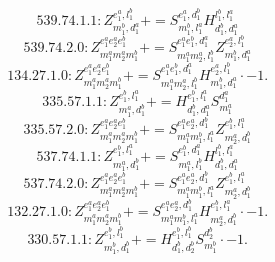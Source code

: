 \documentclass[letterpaper,10pt,fleqn,leqno,onecolumn]{article}
\begin{document}
\begin{equation} \;\;\;\;\;\;  539.74.1.1: Z^{e_{1}^{a},l_{1}^{b}}_{m_{1}^{b},d_{1}^{a}}+=S^{e_{1}^{a},d_{1}^{b}}_{m_{1}^{b},l_{1}^{a}}H^{l_{1}^{b},l_{1}^{a}}_{d_{1}^{b},d_{1}^{a}} \end{equation}
\begin{equation} \;\;\;\;\;\;  539.74.2.0: Z^{e_{1}^{a}e_{2}^{a}e_{1}^{b}}_{m_{1}^{a}m_{2}^{a}m_{1}^{b}}+=S^{e_{1}^{a}e_{1}^{b},d_{1}^{a}}_{m_{1}^{a}m_{2}^{a},l_{1}^{b}}Z^{e_{2}^{a},l_{1}^{b}}_{m_{1}^{b},d_{1}^{a}} \end{equation}
\begin{equation} \;\;\;\;\;\;  134.27.1.0: Z^{e_{1}^{a}e_{2}^{a}e_{1}^{b}}_{m_{1}^{a}m_{2}^{a}m_{1}^{b}}+=S^{e_{1}^{a}e_{1}^{b},d_{1}^{a}}_{m_{1}^{a}m_{2}^{a},l_{1}^{b}}H^{e_{2}^{a},l_{1}^{b}}_{m_{1}^{b},d_{1}^{a}}\cdot -1. \end{equation}
\begin{equation} \;\;\;\;\;\;  335.57.1.1: Z^{e_{1}^{b},l_{1}^{a}}_{m_{1}^{a},d_{1}^{b}}+=H^{e_{1}^{b},l_{1}^{a}}_{d_{1}^{b},d_{1}^{a}}S^{d_{1}^{a}}_{m_{1}^{a}} \end{equation}
\begin{equation} \;\;\;\;\;\;  335.57.2.0: Z^{e_{1}^{a}e_{2}^{a}e_{1}^{b}}_{m_{1}^{a}m_{2}^{a}m_{1}^{b}}+=S^{e_{1}^{a}e_{2}^{a},d_{1}^{b}}_{m_{1}^{a}m_{1}^{b},l_{1}^{a}}Z^{e_{1}^{b},l_{1}^{a}}_{m_{2}^{a},d_{1}^{b}} \end{equation}
\begin{equation} \;\;\;\;\;\;  537.74.1.1: Z^{e_{1}^{b},l_{1}^{a}}_{m_{1}^{a},d_{1}^{b}}+=S^{e_{1}^{b},d_{1}^{a}}_{m_{1}^{a},l_{1}^{b}}H^{l_{1}^{b},l_{1}^{a}}_{d_{1}^{b},d_{1}^{a}} \end{equation}
\begin{equation} \;\;\;\;\;\;  537.74.2.0: Z^{e_{1}^{a}e_{2}^{a}e_{1}^{b}}_{m_{1}^{a}m_{2}^{a}m_{1}^{b}}+=S^{e_{1}^{a}e_{2}^{a},d_{1}^{b}}_{m_{1}^{a}m_{1}^{b},l_{1}^{a}}Z^{e_{1}^{b},l_{1}^{a}}_{m_{2}^{a},d_{1}^{b}} \end{equation}
\begin{equation} \;\;\;\;\;\;  132.27.1.0: Z^{e_{1}^{a}e_{2}^{a}e_{1}^{b}}_{m_{1}^{a}m_{2}^{a}m_{1}^{b}}+=S^{e_{1}^{a}e_{2}^{a},d_{1}^{b}}_{m_{1}^{a}m_{1}^{b},l_{1}^{a}}H^{e_{1}^{b},l_{1}^{a}}_{m_{2}^{a},d_{1}^{b}}\cdot -1. \end{equation}
\begin{equation} \;\;\;\;\;\;  330.57.1.1: Z^{e_{1}^{b},l_{1}^{b}}_{m_{1}^{b},d_{1}^{b}}+=H^{e_{1}^{b},l_{1}^{b}}_{d_{1}^{b},d_{2}^{b}}S^{d_{2}^{b}}_{m_{1}^{b}}\cdot -1. \end{equation}
\end{document}
